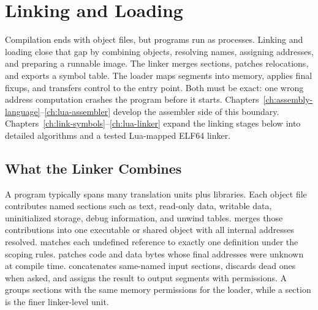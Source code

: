 \chapter{Linking and Loading}\label{ch:linking-loading}

Compilation ends with object files, but programs run as processes.
Linking and loading close that gap by combining objects, resolving names, assigning addresses, and preparing a runnable image.
The linker merges sections, patches relocations, and exports a symbol table.
The loader maps segments into memory, applies final fixups, and transfers control to the entry point.
Both must be exact: one wrong address computation crashes the program before it starts.
Chapters~\ref{ch:assembly-language}--\ref{ch:lua-assembler} develop the assembler side of this boundary.
Chapters~\ref{ch:link-symbols}--\ref{ch:lua-linker} expand the linking stages below into detailed algorithms and a tested Lua-mapped ELF64 linker.

\section{What the Linker Combines}\label{sec:ch29-linker-job}

A program typically spans many translation units plus libraries.
Each object file contributes named sections such as text, read-only data, writable data, uninitialized storage, debug information, and unwind tables.
 merges those contributions into one executable or shared object with all internal addresses resolved.
 matches each undefined reference to exactly one definition under the scoping rules.
 patches code and data bytes whose final addresses were unknown at compile time.
 concatenates same-named input sections, discards dead ones when asked, and assigns the result to output segments with permissions.
A  groups sections with the same memory permissions for the loader, while a section is the finer linker-level unit.

